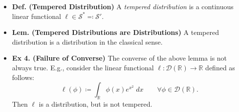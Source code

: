 \documentclass{article}
\begin{document}
\begin{itemize}
 	\begin{solutions}
 		Let $\phi \in \mathcal{S}$. Now choose a sequence $\{\eta_{j}\}_{j = 1}^{\infty} \subseteq C_{c}^{\infty}(\mathbb{R}^{n})$ be such that 
 			\begin{equation}
 				\eta_{j} = \eta\left(\frac{x}{j}\right), 
 			\end{equation}
 		where $\eta \in C_{c}^{\infty}(\mathbb{R}^{n})$ is some test function satisfying $\operatorname{supp}{\eta} \subseteq B_{2}(0)$, and $\eta \equiv 1$ in $B_{1}(0)$. We estimate: 
 			\begin{align}
 				\begin{split}
 					\abs{\partial^{\alpha}\left(\phi \eta_{j} - \phi\right)} &\leq \sum_{0 \leq \beta \leq \alpha}\sup_{|x| \geq j}|\partial^{\beta}\phi|. 
 				\end{split}
 			\end{align}
 		Therefore, 
 			\begin{align}
 				\begin{split}
 					\sup_{x \in \mathbb{R}^{n}}(1 + |x|)^{N}|\partial^{\alpha}(\phi \eta_{j} - \phi)| &= \sup_{|x|\geq j}(1 + |x|)^{N}|\partial^{\alpha}(\phi\eta_{j} - \phi)| \\
 					&\leq \sup_{|x|\geq j}(1 + |x|)^{N}\sum_{0 \leq \beta \leq \alpha}|\partial^{\beta}\phi| \\
 					&\leq \sum_{|x|\geq j}\sup(1 + |x|)^{-1}(1 + |x|)^{N+1}\sum_{0 \leq \beta \leq \alpha}|\partial^{\beta}\phi| \\
 					&\leq \frac{1}{1 + j}\sup_{x \in \mathbb{R}^{n}}(1 + |x|)^{N + 1}\sum_{0 \leq \beta \leq \alpha}|\partial^{\beta}\phi| \xrightarrow{j \to \infty} 0, 
 				\end{split}
 			\end{align}
 		where the last line follows from the fact that the sum of Schwartz functions is a Schwartz function. Hence, this concludes the proof. 
 	\end{solutions}
 	
 	\item \textbf{Def. (Tempered Distribution)} A \textit{tempered distribution} is a continuous linear functional $\ell \in \mathcal{S}^{\ast} \eqqcolon \mathcal{S}'$. 
 	
 	\item \textbf{Lem. (Tempered Distributions are Distributions)} A tempered distribution is a distribution in the classical sense. 
 		
 	\item \textbf{Ex 4. (Failure of Converse)} The converse of the above lemma is not always true. E.g., consider the linear functional $\ell: \mathcal{D}(\mathbb{R}) \to \mathbb{R}$ defined as follows:
 		\begin{equation}
 			\ell(\phi) \coloneqq \int_{\mathbb{R}}\phi(x)e^{x^{2}}\;dx \qquad \forall \phi \in \mathcal{D}(\mathbb{R}). 
 		\end{equation}
 	Then $\ell$ is a distribution, but is not tempered. 
 		

\end{itemize}
\end{document}
